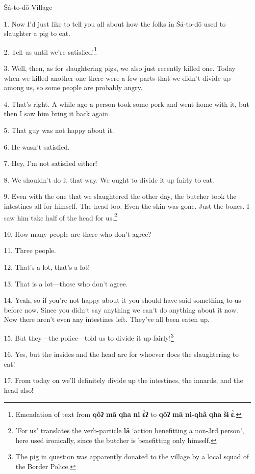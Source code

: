 \setcounter{footnote}{0}

Šá-to-dō Village

1. Now I'd just like to tell you all about how the folks in Šá-to-dō used to
slaughter a pig to eat.

2. Tell us until we're satisfied!\footnote{Emendation of text from \textbf{qôʔ} \textbf{mā} \textbf{qha} \textbf{ni} \textbf{ɛ̀ʔ} to \textbf{qôʔ} \textbf{mā} \textbf{ni-qhâ} \textbf{qha} \textbf{šɨ} \textbf{ɛ̀}.}

3. Well, then, as for slaughtering pigs, we also just recently killed one. Today
when we killed another one there were a few parts that we didn't divide up among
us, so some people are probably angry.

4. That's right. A while ago a person took some pork and went home with it, but
then I saw him bring it back again.

5. That guy was not happy about it.

6. He wasn't satisfied.

7. Hey, I'm not satisfied either!

8. We shouldn't do it that way. We ought to divide it up fairly to eat.

9. Even with the one that we slaughtered the other day, the butcher took the intestines
all for himself. The head too. Even the skin was gone. Just the bones. I saw him
take half of the head for us.\footnote{'For us' translates the verb-particle \textbf{lâ} `action benefitting a non-3rd person', here used ironically, since the butcher is benefitting only himself.}

10. How many people are there who don't agree?

11. Three people.

12. That's a lot, that's a lot!

13. That is a lot---those who don't agree.

14. Yeah, so if you're not happy about it you should have said something to us
before now. Since you didn't say anything we can't do anything about it now. Now
there aren't even any intestines left. They've all been eaten up.

15. But they---the police---told us to divide it up fairly!\footnote{The pig in question was apparently donated to the village by a local squad of the Border Police.}

16. Yes, but the insides and the head are for whoever does the slaughtering to
eat!

17. From today on we'll definitely divide up the intestines, the innards, and the
head also!

